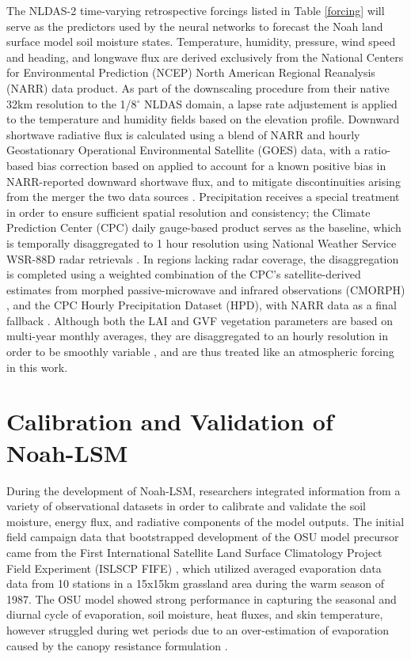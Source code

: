 The NLDAS-2 time-varying retrospective forcings listed in Table \ref{forcing} will serve as the predictors used by the neural networks to forecast the Noah land surface model soil moisture states. Temperature, humidity, pressure, wind speed and heading, and longwave flux are derived exclusively from the National Centers for Environmental Prediction (NCEP) North American Regional Reanalysis (NARR) data product. As part of the downscaling procedure from their native 32km resolution to the 1/8$^\circ$ NLDAS domain, a lapse rate adjustement is applied to the temperature and humidity fields based on the elevation profile. Downward shortwave radiative flux is calculated using a blend of NARR and hourly Geostationary Operational Environmental Satellite (GOES) data, with a ratio-based bias correction based on \citep{berg_impact_2003} applied to account for a known positive bias in NARR-reported downward shortwave flux, and to mitigate discontinuities arising from the merger the two data sources \citep{pinker_surface_2003} \citep{xia_continental-scale_2012-1}. Precipitation receives a special treatment in order to ensure sufficient spatial resolution and consistency; the Climate Prediction Center (CPC) daily gauge-based product \citep{chen_assessing_2008} serves as the baseline, which is temporally disaggregated to 1 hour resolution using National Weather Service WSR-88D radar retrievals \citep{fulton_wsr-88d_1998}. In regions lacking radar coverage, the disaggregation is completed using a weighted combination of the CPC's satellite-derived estimates from morphed passive-microwave and infrared observations (CMORPH) \citep{joyce_cmorph_2004}, and the CPC Hourly Precipitation Dataset (HPD), with NARR data as a final fallback \citep{baldwin_ncep_1997}.  Although both the LAI and GVF vegetation parameters are based on multi-year monthly averages, they are disaggregated to an hourly resolution in order to be smoothly variable \citep{wei_improvement_2011}, and are thus treated like an atmospheric forcing in this work.

\section{Calibration and Validation of Noah-LSM}

During the development of Noah-LSM, researchers integrated information from a variety of observational datasets in order to calibrate and validate the soil moisture, energy flux, and radiative components of the model outputs. The initial field campaign data that bootstrapped development of the OSU model precursor came from the First International Satellite Land Surface Climatology Project Field Experiment (ISLSCP FIFE) \citep{sellers_overview_1992}, which utilized averaged evaporation data data from 10 stations in a 15x15km grassland area during the warm season of 1987. The OSU model showed strong performance in capturing the seasonal and diurnal cycle of evaporation, soil moisture, heat fluxes, and skin temperature, however struggled during wet periods due to an over-estimation of evaporation caused by the canopy resistance formulation \citep{chen_modeling_1996}.

